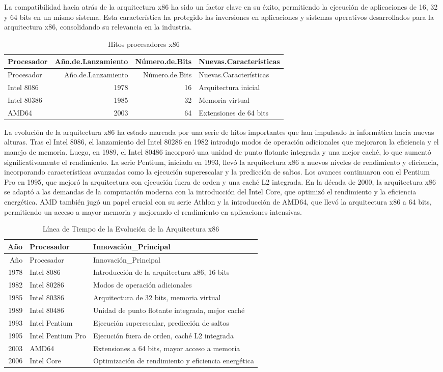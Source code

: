 \documentclass[12pt,twoside]{templates/unerthesis}
\begin{document}
La compatibilidad hacia atrás de la arquitectura x86 ha sido un factor clave en su éxito, permitiendo la ejecución de aplicaciones de 16, 32 y 64 bits en un mismo sistema. Esta característica ha protegido las inversiones en aplicaciones y sistemas operativos desarrollados para la arquitectura x86, consolidando su relevancia en la industria.

\begin{longtable}[]{@{}lrrl@{}}
\caption{\label{tab:tabla-procesadores}Hitos procesadores x86}\tabularnewline
\toprule
Procesador & Año.de.Lanzamiento & Número.de.Bits & Nuevas.Características\tabularnewline
\midrule
\endfirsthead
\toprule
Procesador & Año.de.Lanzamiento & Número.de.Bits & Nuevas.Características\tabularnewline
\midrule
\endhead
Intel 8086 & 1978 & 16 & Arquitectura inicial\tabularnewline
Intel 80386 & 1985 & 32 & Memoria virtual\tabularnewline
AMD64 & 2003 & 64 & Extensiones de 64 bits\tabularnewline
\bottomrule
\end{longtable}

La evolución de la arquitectura x86 ha estado marcada por una serie de hitos importantes que han impulsado la informática hacia nuevas alturas. Tras el Intel 8086, el lanzamiento del Intel 80286 en 1982 introdujo modos de operación adicionales que mejoraron la eficiencia y el manejo de memoria. Luego, en 1989, el Intel 80486 incorporó una unidad de punto flotante integrada y una mejor caché, lo que aumentó significativamente el rendimiento.
La serie Pentium, iniciada en 1993, llevó la arquitectura x86 a nuevos niveles de rendimiento y eficiencia, incorporando características avanzadas como la ejecución superescalar y la predicción de saltos. Los avances continuaron con el Pentium Pro en 1995, que mejoró la arquitectura con ejecución fuera de orden y una caché L2 integrada.
En la década de 2000, la arquitectura x86 se adaptó a las demandas de la computación moderna con la introducción del Intel Core, que optimizó el rendimiento y la eficiencia energética. AMD también jugó un papel crucial con su serie Athlon y la introducción de AMD64, que llevó la arquitectura x86 a 64 bits, permitiendo un acceso a mayor memoria y mejorando el rendimiento en aplicaciones intensivas.

\begin{longtable}[]{@{}rll@{}}
\caption{\label{tab:tabla-evolucion-x86}Línea de Tiempo de la Evolución de la Arquitectura x86}\tabularnewline
\toprule
Año & Procesador & Innovación\_Principal\tabularnewline
\midrule
\endfirsthead
\toprule
Año & Procesador & Innovación\_Principal\tabularnewline
\midrule
\endhead
1978 & Intel 8086 & Introducción de la arquitectura x86, 16 bits\tabularnewline
1982 & Intel 80286 & Modos de operación adicionales\tabularnewline
1985 & Intel 80386 & Arquitectura de 32 bits, memoria virtual\tabularnewline
1989 & Intel 80486 & Unidad de punto flotante integrada, mejor caché\tabularnewline
1993 & Intel Pentium & Ejecución superescalar, predicción de saltos\tabularnewline
1995 & Intel Pentium Pro & Ejecución fuera de orden, caché L2 integrada\tabularnewline
2003 & AMD64 & Extensiones a 64 bits, mayor acceso a memoria\tabularnewline
2006 & Intel Core & Optimización de rendimiento y eficiencia energética\tabularnewline
\bottomrule
\end{longtable}
\end{document}

